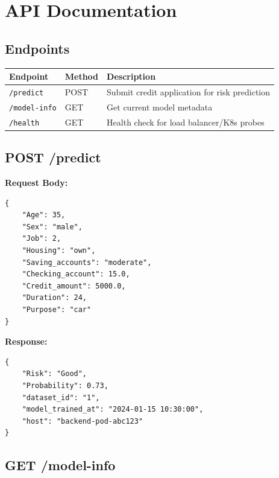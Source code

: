 \documentclass[11pt,a4paper]{article}
\begin{document}
\section{API Documentation}

\subsection{Endpoints}

\begin{table}[H]
\centering
\begin{tabular}{@{}llp{6cm}@{}}
\toprule
\textbf{Endpoint} & \textbf{Method} & \textbf{Description} \\
\midrule
\texttt{/predict} & POST & Submit credit application for risk prediction \\
\texttt{/model-info} & GET & Get current model metadata \\
\texttt{/health} & GET & Health check for load balancer/K8s probes \\
\bottomrule
\end{tabular}
\end{table}

\subsection{POST /predict}

\textbf{Request Body:}
\begin{lstlisting}[style=pythonstyle]
{
    "Age": 35,
    "Sex": "male",
    "Job": 2,
    "Housing": "own",
    "Saving_accounts": "moderate",
    "Checking_account": 15.0,
    "Credit_amount": 5000.0,
    "Duration": 24,
    "Purpose": "car"
}
\end{lstlisting}

\textbf{Response:}
\begin{lstlisting}[style=pythonstyle]
{
    "Risk": "Good",
    "Probability": 0.73,
    "dataset_id": "1",
    "model_trained_at": "2024-01-15 10:30:00",
    "host": "backend-pod-abc123"
}
\end{lstlisting}

\subsection{GET /model-info}
\end{document}
